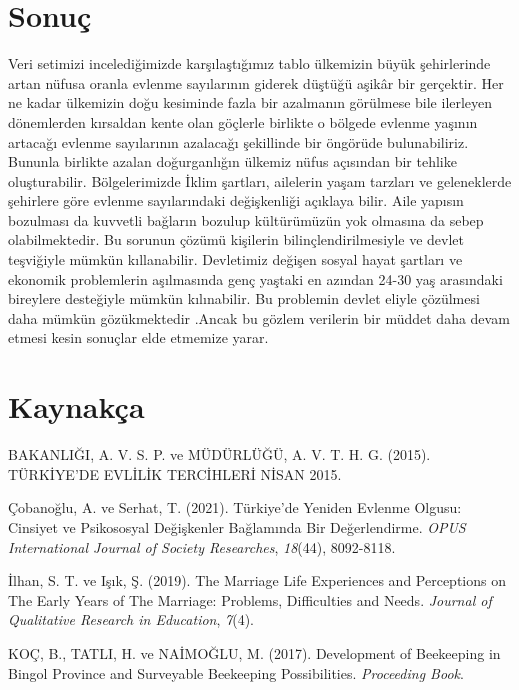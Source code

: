\documentclass[
  12pt,
]{article}
\newlength{\cslhangindent}
\newlength{\cslentryspacingunit} %
\newenvironment{CSLReferences}[2] %
 {%
  \setlength{\parindent}{0pt}
  \ifodd #1
  \let\oldpar\par
  \def\par{\hangindent=\cslhangindent\oldpar}
  \fi
  \setlength{\parskip}{#2\cslentryspacingunit}
 }%
 {}
\begin{document}
\hypertarget{sonuuxe7}{%
\section{Sonuç}\label{sonuuxe7}}

Veri setimizi incelediğimizde karşılaştığımız tablo ülkemizin büyük şehirlerinde artan nüfusa oranla evlenme sayılarının giderek düştüğü aşikâr bir gerçektir. Her ne kadar ülkemizin doğu kesiminde fazla bir azalmanın görülmese bile ilerleyen dönemlerden kırsaldan kente olan göçlerle birlikte o bölgede evlenme yaşının artacağı evlenme sayılarının azalacağı şekillinde bir öngörüde bulunabiliriz. Bununla birlikte azalan doğurganlığın ülkemiz nüfus açısından bir tehlike oluşturabilir. Bölgelerimizde İklim şartları, ailelerin yaşam tarzları ve geleneklerde şehirlere göre evlenme sayılarındaki değişkenliği açıklaya bilir. Aile yapısın bozulması da kuvvetli bağların bozulup kültürümüzün yok olmasına da sebep olabilmektedir. Bu sorunun çözümü kişilerin bilinçlendirilmesiyle ve devlet teşviğiyle mümkün kıllanabilir. Devletimiz değişen sosyal hayat şartları ve ekonomik problemlerin aşılmasında genç yaştaki en azından 24-30 yaş arasındaki bireylere desteğiyle mümkün kılınabilir. Bu problemin devlet eliyle çözülmesi daha mümkün gözükmektedir .Ancak bu gözlem verilerin bir müddet daha devam etmesi kesin sonuçlar elde etmemize yarar.

\newpage

\hypertarget{references}{%
\section{Kaynakça}\label{references}}

\hypertarget{refs}{}
\begin{CSLReferences}{1}{0}
\leavevmode{}%
BAKANLIĞI, A. V. S. P. ve MÜDÜRLÜĞÜ, A. V. T. H. G. (2015). T{Ü}RK{İ}YE'DE EVL{İ}L{İ}K TERC{İ}HLER{İ} N{İ}SAN 2015.

\leavevmode{}%
Çobanoğlu, A. ve Serhat, T. (2021). T{ü}rkiye'de Yeniden Evlenme Olgusu: Cinsiyet ve Psikososyal De{ğ}i{ş}kenler Ba{ğ}lam{ı}nda Bir De{ğ}erlendirme. \emph{OPUS International Journal of Society Researches}, \emph{18}(44), 8092-8118.

\leavevmode{}%
İlhan, S. T. ve Işık, Ş. (2019). The Marriage Life Experiences and Perceptions on The Early Years of The Marriage: Problems, Difficulties and Needs. \emph{Journal of Qualitative Research in Education}, \emph{7}(4).

\leavevmode{}%
KOÇ, B., TATLI, H. ve NAİMOĞLU, M. (2017). Development of Beekeeping in Bingol Province and Surveyable Beekeeping Possibilities. \emph{Proceeding Book}.

\end{CSLReferences}
\end{document}
